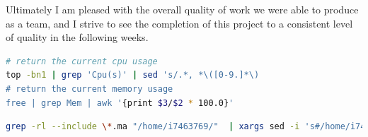 \documentclass[11pt]{article}
\begin{document}
Ultimately I am pleased with the overall quality of work we were able to produce as a team, and I strive to see the completion of this project to a consistent level of quality in the following weeks.

\newpage




\newpage
\appendix

\begin{lstlisting}[language=bash, label={lst:cpumem}, caption={Extract from the Python script used to determine which of the computers on the university network are suitable for rendering on. By capturing the output of the following commands I was able to get the current CPU and memory usage.}]
# return the current cpu usage
top -bn1 | grep 'Cpu(s)' | sed 's/.*, *\([0-9.]*\)
# return the current memory usage
free | grep Mem | awk '{print $3/$2 * 100.0}'
\end{lstlisting}

\begin{lstlisting}[language=bash, label={lst:grep}, caption={The bash script used to replace any absolute paths in Maya scene files, and replace them with file paths suitable for use on the render farm. (Modified from this StackOverflow thread~\cite{stackoverflow})}]
grep -rl --include \*.ma "/home/i7463769/"  | xargs sed -i 's#/home/i7463769/#/render/i7463769/#g'
\end{lstlisting}
\end{document}
